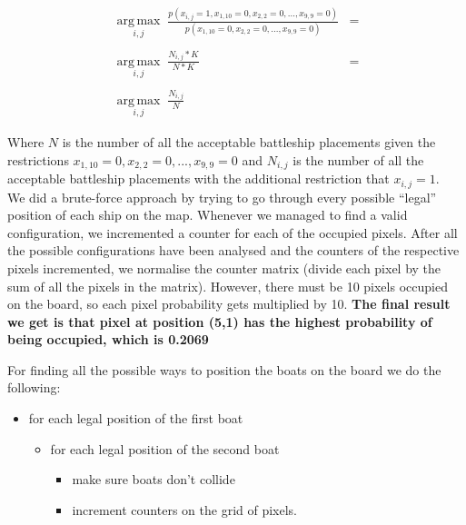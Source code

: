 \documentclass[11pt,a4paper,oneside]{report}
\begin{document}
\begin{align*}
\operatorname*{arg\,max}_{i,j}\;\frac{p(x_{i,j}=1,x_{1,10}=0,x_{2,2}=0,...,x_{9,9}=0)}{p(x_{1,10}=0,x_{2,2}=0,...,x_{9,9}=0)}&=\\\\
\operatorname*{arg\,max}_{i,j}\;\frac{N_{i,j}*K}{N*K}&=\\\\
\operatorname*{arg\,max}_{i,j}\;\frac{N_{i,j}}{N}
\end{align*}

Where $N$ is the number of all the acceptable battleship placements given the restrictions $x_{1,10}=0,x_{2,2}=0,...,x_{9,9}=0$ and $N_{i,j}$ is the number of all the acceptable battleship placements with the additional restriction that $x_{i,j}=1$.\\
We did a brute-force approach by trying to go through every possible “legal” position of each ship on the map. Whenever we managed to find a valid configuration, we incremented a counter for each of the occupied pixels. After all the possible configurations have been analysed and the counters of the respective pixels incremented, we normalise the counter matrix (divide each pixel by the sum of all the pixels in the matrix). However, there must be 10 pixels occupied on the board, so each pixel probability gets multiplied by 10. \textbf{The final result we get is that pixel at position (5,1) has the highest probability of being occupied, which is 0.2069}

For finding all the possible ways to position the boats on the board we do the following:
\begin{itemize}
 \item for each legal position of the first boat
  \begin{itemize}
  \item for each legal position of the second boat
      \begin{itemize}
      \item make sure boats don't collide
      \item increment counters on the grid of pixels.
      \end{itemize}
  \end{itemize}
\end{itemize}
\end{document}
